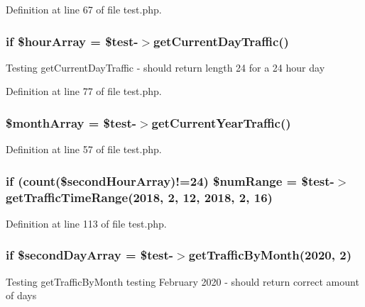 Definition at line 67 of file test.\+php.

\subsubsection[{\$hour\+Array}]{\setlength{\rightskip}{0pt plus 5cm}if \$hour\+Array = \$test-\/$>$get\+Current\+Day\+Traffic()}\label{test_8php_a997718df5e43b02ef37998ab52f74cb6}
Testing get\+Current\+Day\+Traffic -\/ should return length 24 for a 24 hour day 

Definition at line 77 of file test.\+php.

\subsubsection[{\$month\+Array}]{\setlength{\rightskip}{0pt plus 5cm}\$month\+Array = \$test-\/$>$get\+Current\+Year\+Traffic()}\label{test_8php_a0a9fb7e3e04662dfa0c7c2ec403e2734}


Definition at line 57 of file test.\+php.

\subsubsection[{\$num\+Range}]{\setlength{\rightskip}{0pt plus 5cm}if (count(\$second\+Hour\+Array)!=24) \$num\+Range = \$test-\/$>$get\+Traffic\+Time\+Range(2018, 2, 12, 2018, 2, 16)}\label{test_8php_a8b7af4d269daccce936da8eb0293bb6d}


Definition at line 113 of file test.\+php.

\subsubsection[{\$second\+Day\+Array}]{\setlength{\rightskip}{0pt plus 5cm}if \$second\+Day\+Array = \$test-\/$>$get\+Traffic\+By\+Month(2020, 2)}\label{test_8php_ab8151e5eb27fe41385727bc11a25f79f}
Testing get\+Traffic\+By\+Month testing February 2020 -\/ should return correct amount of days 

